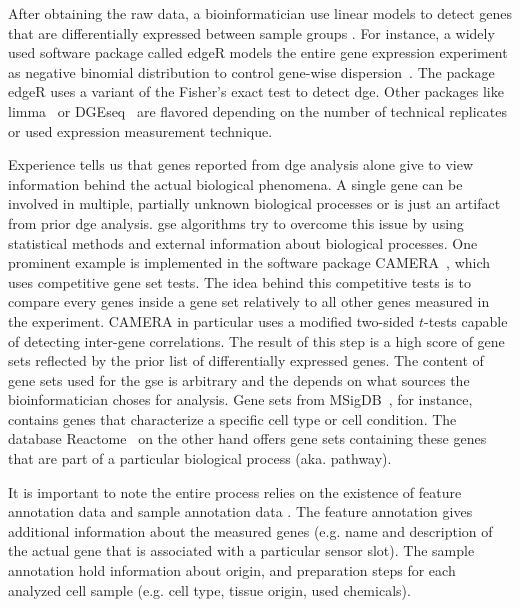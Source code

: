 \documentclass{thesisclass}
\newcommand*\tikzCircled[1]{
	\node[shape=circle,draw,inner sep=2pt, fill=black] (char) {
		\textcolor{white}{#1}
	}
}
\newcommand*\circled[1]{
	\tikz[baseline=(char.base)]{
		\tikzCircled{#1};
	}
}
\begin{document}
After obtaining the raw data, a bioinformatician use linear models to detect genes that are differentially expressed between sample groups \circled{3}. For instance, a widely used software package called edgeR models the entire gene expression experiment as negative binomial distribution to control gene-wise dispersion~\cite{doi:10.1093/bioinformatics/btp616}. The package edgeR uses a variant of the Fisher's exact test to detect \acrfull{dge}. Other packages like limma~\cite{doi:10.1093/nar/gkv007} or DGEseq~\cite{doi:10.1093/bioinformatics/btp612} are flavored depending on the number of technical replicates or used expression measurement technique. 

Experience tells us that genes reported from \acrshort{dge} analysis alone give to view information behind the actual biological phenomena. A single gene can be involved in multiple, partially unknown biological processes or is just an artifact from prior \acrshort{dge} analysis. \acrfull{gse} algorithms try to overcome this issue by using statistical methods and external information about biological processes. One prominent example is implemented in the software package CAMERA~\cite{Wu2012}, which uses competitive gene set tests. The idea behind this competitive tests is to compare every genes inside a gene set relatively to all other genes measured in the experiment. CAMERA in particular uses a modified two-sided $t$-tests capable of detecting inter-gene correlations. The result of this step is a high score \circled{4} of gene sets reflected by the prior list of differentially expressed genes. The content of gene sets used for the \acrshort{gse} is arbitrary and the depends on what sources the bioinformatician choses for analysis. Gene sets from MSigDB~\cite{doi:10.1093/bioinformatics/btr260}, for instance, contains genes that characterize a specific cell type or cell condition. The database Reactome~\cite{doi:10.1093/nar/gki072} on the other hand offers gene sets containing these genes that are part of a particular biological process (aka. pathway).

It is important to note the entire process relies on the existence of feature annotation data \circled{5} and sample annotation data \circled{6}. The feature annotation gives additional information about the measured genes (e.g. name and description of the actual gene that is associated with a particular sensor slot). The sample annotation hold information about origin, and preparation steps for each analyzed cell sample (e.g. cell type, tissue origin, used chemicals).
\end{document}
